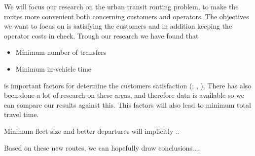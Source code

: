 We will focus our research on the urban transit routing problem, to make the routes more convenient both concerning customers and operators. The objectives we want to focus on is satisfying the customers and in addition keeping the operator costs in check. Trough our research we have found that 
\begin{itemize}
\item Minimum number of transfers
\item Minimum in-vehicle time
\end{itemize}
is important factors for determine the customers satisfaction ({\citet{kechagiopoulos14}; \citet{dias14}, \citet{yang07} }). There has also been done a lot of research on these areas, and therefore data is available so we can compare our results against this. This factors will also lead to minimum total travel time. 
\par
Minimum fleet size and better departures will implicitly ..
\par
Based on these new routes, we can hopefully draw conclusions....
